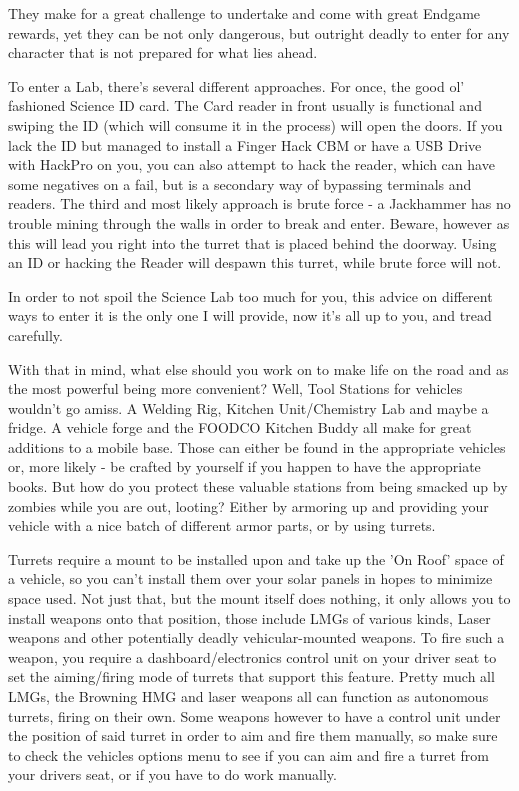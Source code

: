 They make for a great challenge to undertake and come with great Endgame rewards, yet they can be not only dangerous, but outright deadly to enter for any character that is not prepared for what lies ahead.

To enter a Lab, there's several different approaches. For once, the good ol' fashioned Science ID card. The Card reader in front usually is functional and swiping the ID (which will consume it in the process) will open the doors. If you lack the ID but managed to install a Finger Hack CBM or have a USB Drive with HackPro on you, you can also attempt to hack the reader, which can have some negatives on a fail, but is a secondary way of bypassing terminals and readers. The third and most likely approach is brute force - a Jackhammer has no trouble mining through the walls in order to break and enter. Beware, however as this will lead you right into the turret that is placed behind the doorway. Using an ID or hacking the Reader will despawn this turret, while brute force will not.

In order to not spoil the Science Lab too much for you, this advice on different ways to enter it is the only one I will provide, now it's all up to you, and tread carefully.

With that in mind, what else should you work on to make life on the road and as the most powerful being more convenient? Well, Tool Stations for vehicles wouldn't go amiss. A Welding Rig, Kitchen Unit/Chemistry Lab and maybe a fridge. A vehicle forge and the FOODCO Kitchen Buddy all make for great additions to a mobile base. Those can either be found in the appropriate vehicles or, more likely - be crafted by yourself if you happen to have the appropriate books. But how do you protect these valuable stations from being smacked up by zombies while you are out, looting? Either by armoring up and providing your vehicle with a nice batch of different armor parts, or by using turrets.

Turrets require a mount to be installed upon and take up the 'On Roof' space of a vehicle, so you can't install them over your solar panels in hopes to minimize space used. Not just that, but the mount itself does nothing, it only allows you to install weapons onto that position, those include LMGs of various kinds, Laser weapons and other potentially deadly vehicular-mounted weapons. To fire such a weapon, you require a dashboard/electronics control unit on your driver seat to set the aiming/firing mode of turrets that support this feature. Pretty much all LMGs, the Browning HMG and laser weapons all can function as autonomous turrets, firing on their own. Some weapons however to have a control unit under the position of said turret in order to aim and fire them manually, so make sure to check the vehicles options menu to see if you can aim and fire a turret from your drivers seat, or if you have to do work manually.

